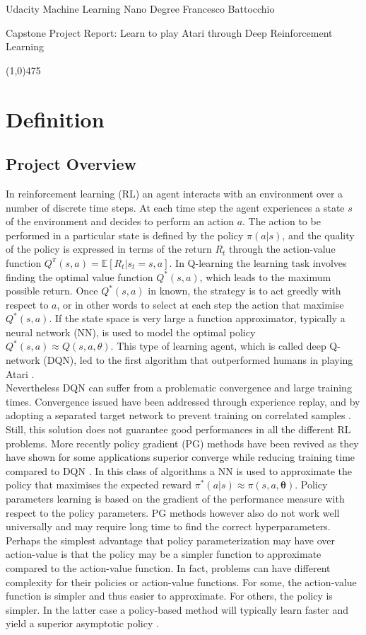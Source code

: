 \documentclass[a4paper, 11pt]{article}
\newcommand{\hl}{\begin{center} \line(1,0){475} \end{center}} %
\newcommand{\ctitle}[1]{\begin{center} \LARGE{#1} \end{center}} %
\begin{document}
\noindent
Udacity Machine Learning Nano Degree \hfill Francesco Battocchio \\


\ctitle{Capstone Project Report: Learn to play Atari through Deep Reinforcement Learning}


\hl
\section{Definition}
\subsection{Project Overview}\label{sec:overview}
In reinforcement learning (RL) an agent interacts with an environment over a number of discrete time steps. At each time step the agent experiences a state $s$ of the environment and decides to perform an action $a$. The action to be performed in a particular state is defined by the policy $\pi(a|s)$, and the quality of the policy is expressed in terms of the return $R_t$ through the action-value function $Q^{\pi}(s,a) = \mathbb{E}[R_t|s_t=s, a]$. In Q-learning the learning task involves finding the optimal value function $Q^*(s,a)$, which leads to the maximum possible return. Once $Q^*(s,a)$ in known, the strategy is to act greedly with respect to $a$, or in other words to select at each step the action that maximise $Q^*(s,a)$.  If the state space is very large a function approximator, typically a neural network (NN), is used to model the optimal policy $Q^*(s,a) \approx Q(s,a,\theta)$. This type of learning agent, which is called deep Q-network (DQN), led to the first algorithm that outperformed humans in playing Atari \cite{Mnih2013}.\\
Nevertheless DQN can suffer from a problematic convergence and large training times. Convergence issued have been addressed through experience replay, and by adopting a separated target network to prevent training on correlated samples \cite{Mnih2015}. Still, this solution does not guarantee good performances in all the different RL problems. More recently policy gradient (PG) methods have been revived as they have shown for some applications superior converge while reducing training time compared to DQN \cite{Mnih2016}. In this class of algorithms a NN is used to approximate the policy that maximises the expected reward $\pi^*(a|s) \approx \pi(s,a,\mathbf{\theta})$. Policy parameters learning is based on the gradient of the performance measure with respect to the policy parameters. PG methods however also do not work well universally and may require long time to find the correct hyperparameters. Perhaps the simplest advantage that policy parameterization may have over action-value is that the policy may be a simpler function to approximate compared to the action-value function. In fact, problems can have different complexity for their policies or action-value functions. For some, the action-value function is simpler and thus easier to approximate. For others, the policy is simpler. In the latter case a policy-based method will typically learn faster and yield a superior asymptotic policy \cite{Sutton}.  
\end{document}
